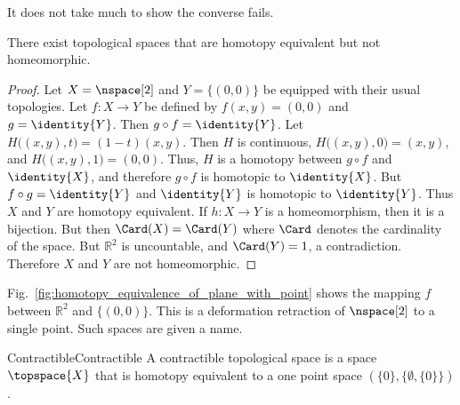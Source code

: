 \documentclass{book}                                                           %
\begin{document}
                It does not take much to show the converse fails.
                \begin{theorem}
                    \label{thm:homotopic_does_not_imply_homeomorphic}%
                    There exist topological spaces that are homotopy equivalent
                    but not homeomorphic.
                \end{theorem}
                \begin{proof}
                    Let $X=\nspace[2]$ and $Y=\{(0,0)\}$ be equipped with their
                    usual topologies. Let $f:X\rightarrow{Y}$ be defined by
                    $f(x,y)=(0,0)$ and $g=\identity{Y}$. Then
                    $g\circ{f}=\identity{Y}$. Let
                    $H\big((x,y),t\big)=(1-t)(x,y)$. Then $H$ is continuous,
                    $H\big((x,y),0\big)=(x,y)$, and $H\big((x,y),1\big)=(0,0)$.
                    Thus, $H$ is a homotopy between ${g}\circ{f}$ and
                    $\identity{X}$, and therefore ${g}\circ{f}$ is homotopic to
                    $\identity{X}$. But ${f}\circ{g}=\identity{Y}$ and
                    $\identity{Y}$ is homotopic to $\identity{Y}$. Thus $X$ and
                    $Y$ are homotopy equivalent. If $h:{X}\rightarrow{Y}$ is a
                    homeomorphism, then it is a bijection. But then
                    $\Card(X)=\Card(Y)$ where $\Card$ denotes the cardinality
                    of the space. But $\mathbb{R}^{2}$ is uncountable, and
                    $\Card(Y)=1$, a contradiction. Therefore $X$ and $Y$ are not
                    homeomorphic.
                \end{proof}
                Fig.~\ref{fig:homotopy_equivalence_of_plane_with_point}
                shows the mapping $f$ between $\mathbb{R}^{2}$ and $\{(0,0)\}$.
                This is a deformation retraction of $\nspace[2]$ to a single
                point. Such spaces are given a name.
                \begin{fdefinition}{Contractible}{Contractible}
                    A contractible topological space is a space $\topspace{X}$
                    that is homotopy equivalent to a one point space
                    $(\{0\},\{\emptyset,\{0\}\})$.
                \end{fdefinition}
                \par
\end{document}
